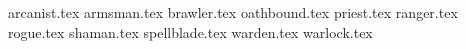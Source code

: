 {arcanist.tex}
\clearpage
{armsman.tex}
\clearpage
{brawler.tex}
\clearpage
{oathbound.tex}
\clearpage
{priest.tex}
\clearpage
{ranger.tex}
\clearpage
{rogue.tex}
\clearpage
{shaman.tex}
\clearpage
{spellblade.tex}
\clearpage
{warden.tex}
\clearpage
{warlock.tex}
\clearpage
